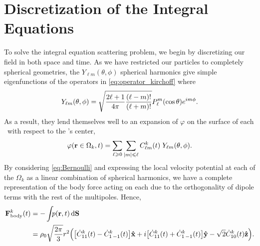 \section{Discretization of the Integral Equations}

To solve the integral equation scattering problem, we begin by discretizing our field in both space and time.
As we have restricted our particles to completely spherical geometries, the $Y_{\ell m}(\theta, \phi)$ spherical harmonics give simple eigenfunctions of the operators in \cref{eq:operator_kirchoff} where
\begin{equation} \label{eq:Ylms}
  Y_{\ell m}\quantity(\theta, \phi) = \sqrt{\frac{2\ell + 1}{4\pi}\frac{\quantity(\ell - m)!}{\quantity(\ell + m)!}}P_\ell^m\quantity(\cos\theta)e^{i m \phi}.
\end{equation}
As a result, they lend themselves well to an expansion of $\varphi$ on the surface of each \bubble\ with respect to the \bubble's center,
\begin{equation} \label{eq:potential_expansion}
  \varphi(\vb{r}\in\Omega_k, t) = \sum_{\ell \geqslant 0} \sum_{\abs{m} \leqslant \ell} C^k_{\ell m}(t) \; Y_{\ell m}\qty(\theta, \phi).
\end{equation}
By considering \cref{eq:Bernoulli} and expressing the local velocity potential at each of the $\Omega_k$ as a linear combination of spherical harmonics, we have a complete representation of the body force acting on each \bubble{} due to the orthogonality of dipole terms with the rest of the multipoles.
Hence,
\begin{align}
  \vb{F}_\text{body}^k(t) &= - \int_{} p(\vb{r}, t) \dd{\vb{S}} \nonumber \\
  &= \rho_0 \sqrt{\frac{2\pi}{3}}r^2 \Big(\qty[\dot{C}^k_{11}(t) - \dot{C}^k_{1\, -1}(t)]\vu{x} + i\qty[\dot{C}^k_{11}(t) + \dot{C}^k_{1\,-1}(t)]\vu{y} - \sqrt{2}\dot{C}^k_{10}(t)\vu{z}\Big).
\end{align}

